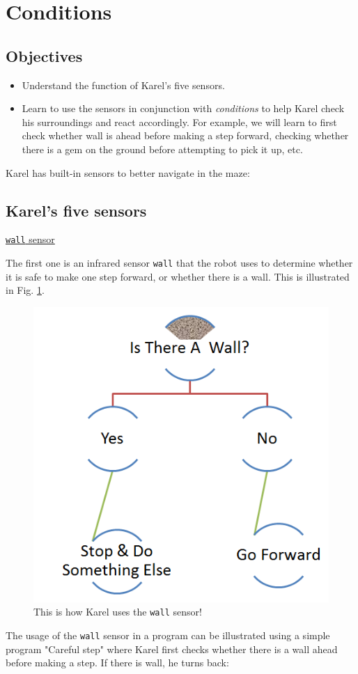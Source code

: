 
\section{Conditions} \label{sec:cond}

\subsection{Objectives} 

\begin{itemize}
\item Understand the function of Karel's five sensors.
\item Learn to use the sensors in conjunction with {\em conditions} to help Karel 
      check his surroundings and react accordingly. For example, we will learn to first 
      check whether wall is ahead before making a step forward, checking whether there
      is a gem on the ground before attempting to pick it up, etc.
\end{itemize}

\noindent
Karel has built-in sensors to better navigate in the maze:

\subsection{Karel's five sensors}

\noindent
\underline{{\tt wall} sensor}

The first one is an infrared sensor {\tt wall} that the robot uses to determine 
whether it is safe to make one step forward, or whether there is a wall. This is 
illustrated in Fig. \ref{fig:dede-ifelse}.

\begin{figure}[!ht]
\begin{center}
\includegraphics[height=0.4\textwidth]{imgk/salih-ifelse.png}
\end{center}
\vspace{-4mm}
\caption{This is how Karel uses the {\tt wall} sensor!}
\label{fig:dede-ifelse}
\end{figure}
\noindent
The usage of the {\tt wall} sensor in a program can be illustrated using a simple program "Careful step" 
where Karel first checks whether there is a wall ahead before
making a step. If there is wall, he turns back: 

